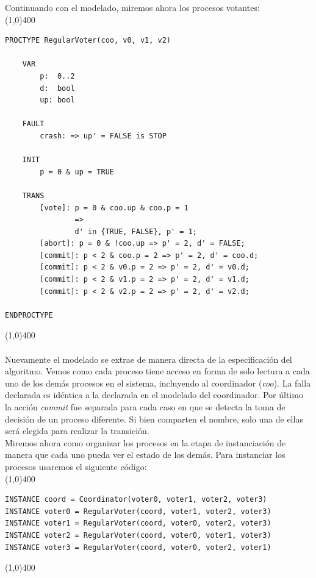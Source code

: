 \documentclass[titlepage, 12pt]{book}
\begin{document}
Continuando con el modelado, miremos ahora los procesos votantes:\\

\noindent \line(1,0){400}
\begin{verbatim}
PROCTYPE RegularVoter(coo, v0, v1, v2)
    
    VAR
        p:  0..2
        d:  bool
        up: bool

    FAULT
        crash: => up' = FALSE is STOP
    
    INIT
        p = 0 & up = TRUE

    TRANS
        [vote]: p = 0 & coo.up & coo.p = 1
                => 
                d' in {TRUE, FALSE}, p' = 1;
        [abort]: p = 0 & !coo.up => p' = 2, d' = FALSE;
        [commit]: p < 2 & coo.p = 2 => p' = 2, d' = coo.d;
        [commit]: p < 2 & v0.p = 2 => p' = 2, d' = v0.d;
        [commit]: p < 2 & v1.p = 2 => p' = 2, d' = v1.d;
        [commit]: p < 2 & v2.p = 2 => p' = 2, d' = v2.d;

ENDPROCTYPE
\end{verbatim}
\line(1,0){400}
~\\\\


Nuevamente el modelado se extrae de manera directa de la especificación del algoritmo. Vemos como cada proceso tiene acceso en forma de solo lectura a cada uno de los demás procesos en el sistema, incluyendo al coordinador (\textit{coo}). La falla declarada es idéntica a la declarada en el modelado del coordinador. Por último la acción \textit{commit} fue separada para cada caso en que se detecta la toma de decisión de un proceso diferente. Si bien comparten el nombre, solo una de ellas será elegida para realizar la transición.\\

Miremos ahora como organizar los procesos en la etapa de instanciación de manera que cada uno pueda ver el estado de los demás. Para instanciar los procesos usaremos el siguiente código:\\

\noindent \line(1,0){400}
\begin{verbatim}
INSTANCE coord = Coordinator(voter0, voter1, voter2, voter3)
INSTANCE voter0 = RegularVoter(coord, voter1, voter2, voter3)
INSTANCE voter1 = RegularVoter(coord, voter0, voter2, voter3)
INSTANCE voter2 = RegularVoter(coord, voter0, voter1, voter3)
INSTANCE voter3 = RegularVoter(coord, voter0, voter2, voter1)
\end{verbatim}
\noindent \line(1,0){400}
~\\\\
\end{document}
